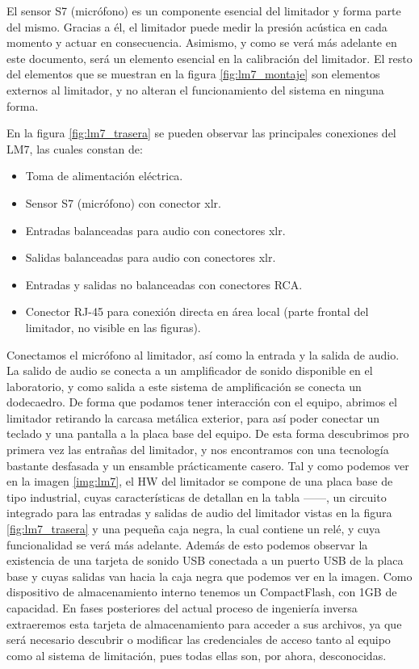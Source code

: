 El sensor S7 (micrófono) es un componente esencial del limitador y forma parte del mismo. Gracias a él, el limitador puede medir la presión acústica en cada momento y actuar en consecuencia. Asimismo, y como se verá más adelante en este documento, será un elemento esencial en la calibración del limitador. El resto del elementos que se muestran en la figura \ref{fig:lm7_montaje} son elementos externos al limitador, y no alteran el funcionamiento del sistema en ninguna forma.

En la figura \ref{fig:lm7_trasera} se pueden observar las principales conexiones del \acrshort{LM7}, las cuales constan de:

\begin{itemize}
    \item Toma de alimentación eléctrica.
    \item Sensor S7 (micrófono) con conector \acrshort{xlr}.
    \item Entradas balanceadas para audio con conectores \acrshort{xlr}.
    \item Salidas balanceadas para audio con conectores \acrshort{xlr}.
    \item Entradas y salidas no balanceadas con conectores \gls{RCA}.
    \item Conector RJ-45 para conexión directa en área local (parte frontal del limitador, no visible en las figuras).
\end{itemize}

Conectamos el micrófono al limitador, así como la entrada y la salida de audio. La salido de audio se conecta a un amplificador de sonido disponible en el laboratorio, y como salida a este sistema de amplificación se conecta un dodecaedro. De forma que podamos tener interacción con el equipo, abrimos el limitador retirando la carcasa metálica exterior, para así poder conectar un teclado y una pantalla a la placa base del equipo. De esta forma descubrimos pro primera vez las entrañas del limitador, y nos encontramos con una tecnología bastante desfasada y un ensamble prácticamente casero. Tal y como podemos ver en la imagen \ref{img:lm7}, el \gls{HW} del limitador se compone de una placa base de tipo industrial, cuyas características de detallan en la tabla ------, un circuito integrado para las entradas y salidas de audio del limitador vistas en la figura \ref{fig:lm7_trasera} y una pequeña caja negra, la cual contiene un relé, y cuya funcionalidad se verá más adelante. Además de esto podemos observar la existencia de una tarjeta de sonido USB conectada a un puerto USB de la placa base y cuyas salidas van hacia la caja negra que podemos ver en la imagen. Como dispositivo de almacenamiento interno tenemos un CompactFlash, con 1GB de capacidad. En fases posteriores del actual proceso de ingeniería inversa extraeremos esta tarjeta de almacenamiento para acceder a sus archivos, ya que será necesario descubrir o modificar las credenciales de acceso tanto al equipo como al sistema de limitación, pues todas ellas son, por ahora, desconocidas.

